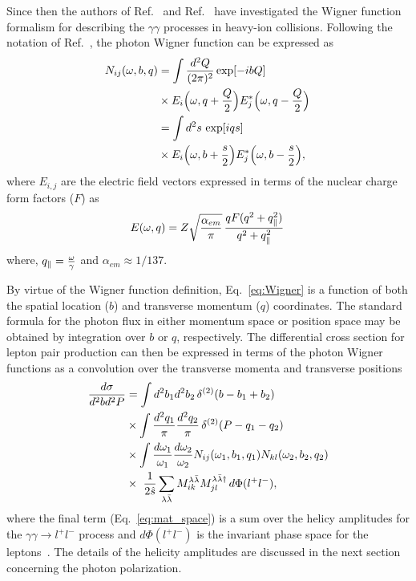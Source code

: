 \documentclass[12pt,epjc3]{svjour3}\sloppy
\begin{document}
Since then the authors of Ref.~\cite{kleinLeptonPairProduction2020a,Wang:2021kxm} and Ref.~\cite{klusek-gawendaCentralityDependenceDilepton2021} have investigated the Wigner function formalism for describing the $\gamma\gamma$ processes in heavy-ion collisions.
Following the notation of Ref.~\cite{klusek-gawendaCentralityDependenceDilepton2021}, the photon Wigner function can be expressed as
\begin{align}
  \begin{split}
    \label{eq:Wigner}
    N_{ij} (\omega,b,q) & = \int {d^2 Q \over (2 \pi)^2} \exp[-i b Q] \\ 
    & \times E_i \Big(\omega, q + {Q \over 2} \Big) E^*_j \Big(\omega, q - {Q \over 2} \Big) \, 
    \\
    & = \int d^2s \,  \exp[i q s] \\ 
    & \times E_i \Big(\omega, b + {s \over 2} \Big) E^*_j \Big(\omega, b - {s \over 2} \Big),
  \end{split}
\end{align}
where $E_{i,j}$ are the electric field vectors expressed in terms of the nuclear charge form factors ($F$) as
\begin{eqnarray}
    E (\omega,q) = Z \sqrt{\frac{\alpha_{em}}{\pi}} \,  {q F(q^2+q^2_\parallel) \over q^2 + q^2_\parallel} \,
\end{eqnarray}
where, $q_\parallel = {\omega \over \gamma}$ and $\alpha_{em}\approx 1/137$.

By virtue of the Wigner function definition, Eq.~\ref{eq:Wigner} is a function of both the spatial location ($b$) and transverse momentum ($q$) coordinates.
The standard formula for the photon flux in either momentum space or position space may be obtained by integration over $b$ or $q$, respectively. The differential cross section for lepton pair production can then be expressed in terms of the photon Wigner functions as a convolution over the transverse momenta and transverse positions~\cite{klusek-gawendaCentralityDependenceDilepton2021}
\begin{equation}
    \begin{split}
        \label{eq:mat_space}
        {d\sigma \over d^2b d^2P} &= \int d^2b_1 d^2b_2 \, \delta^{(2)}(b-b_1 + b_2)  \\
        &\times \int {d^2q_1 \over \pi} {d^2q_2 \over \pi} \, \delta^{(2)}(P-q_1 - q_2) \\
        &\times
        \int {d \omega_1 \over \omega_1} {d \omega_2 \over \omega_2} N_{ij} (\omega_1,b_1,q_1) N_{kl} (\omega_2,b_2,q_2)   \\ 
        &\times \, \, {1 \over 2 \hat s} \sum_{\lambda \bar \lambda} M^{\lambda \bar \lambda}_{ik} M^{\lambda \bar \lambda \dagger}_{jl} \, d\Phi(l^+ l^-),
    \end{split}
\end{equation}
where the final term (Eq.~\ref{eq:mat_space}) is a sum over the helicy amplitudes for the $\gamma\gamma \rightarrow l^+l^-$ process and $d\Phi(l^+ l^-)$ is the invariant phase space for the leptons~\cite{klusek-gawendaCentralityDependenceDilepton2021}. The details of the helicity amplitudes are discussed in the next section concerning the photon polarization.
\end{document}
